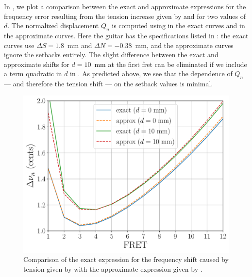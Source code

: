 In , we plot a comparison between the exact and approximate expressions for the frequency error resulting from the tension increase given by  and  for two values of $d$. The normalized displacement $Q_n$ is computed using  in the exact curves and  in the approximate curves. Here the guitar has the specifications listed in : the exact curves use $\Delta S = 1.8$~mm and $\Delta N = -0.38$~mm, and the approximate curves ignore the setbacks entirely. The slight difference between the exact and approximate shifts for $d = 10$~mm at the first fret can be eliminated if we include a term quadratic in $d$ in . As predicted above, we see that the dependence of $Q_n$ --- and therefore the tension shift --- on the setback values is minimal.

\begin{figure}
  \centering
  \includegraphics[width=5.0in]{figures/tnu_test}
  \caption{\label{fig:tnu_test} Comparison of the exact expression for the frequency shift caused by tension given by  with the approximate expression given by .}
\end{figure}

